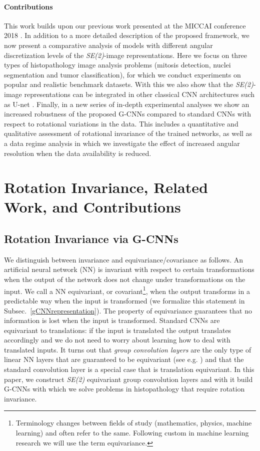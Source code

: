 \documentclass[twocolumn,final]{article}
\newcommand{\se}[1]{\textit{SE(#1)}}
\begin{document}
\paragraph{Contributions}
This work builds upon our previous work presented at the MICCAI conference 2018 \citep{bekkers2018roto}.
In addition to a more detailed description of the proposed framework, we now present a comparative analysis of models with different angular discretization levels of the \se{2}-image representations.
Here we focus on three types of histopathology image analysis problems (mitosis detection, nuclei segmentation and tumor classification), for which we conduct experiments on popular and realistic benchmark datasets.
With this we also show that the \se{2}-image representations can be integrated in other classical CNN architectures such as U-net \citep{ronneberger2015unet}.
Finally, in a new series of in-depth experimental analyses we show an increased robustness of the proposed G-CNNs compared to standard CNNs with respect to rotational variations in the data.
This includes a quantitative and qualitative assessment of rotational invariance of the trained networks, as well as a data regime analysis in which we investigate the effect of increased angular resolution when the data availability is reduced.



\section{Rotation Invariance, Related Work, and Contributions}
\subsection{Rotation Invariance via G-CNNs}
We distinguish between invariance and equivariance/covariance as follows.
An artificial neural network (NN) is invariant with respect to certain transformations when the output of the network does not change under transformations on the input. We call a NN equivariant, or covariant\footnote{Terminology changes between fields of study (mathematics, physics, machine learning) and often refer to the same. Following custom in machine learning research we will use the term equivariance.}, when the output transforms in a predictable way when the input is transformed (we formalize this statement in Subsec.~\ref{gCNNrepresentation}). The property of equivariance guarantees that no information is lost when the input is transformed. Standard CNNs are equivariant to translations: if the input is translated the output translates accordingly and we do not need to worry about learning how to deal with translated inputs. It turns out that \emph{group convolution layers} are the only type of linear NN layers that are guaranteed to be equivariant (see e.g. \citep[Thm.~1]{bekkers_b-spline_2019}) and that the standard convolution layer is a special case that is translation equivariant. In this paper, we construct \se{2} equivariant group convolution layers and with it build G-CNNs with which we solve problems in histopathology that require rotation invariance.
\end{document}
